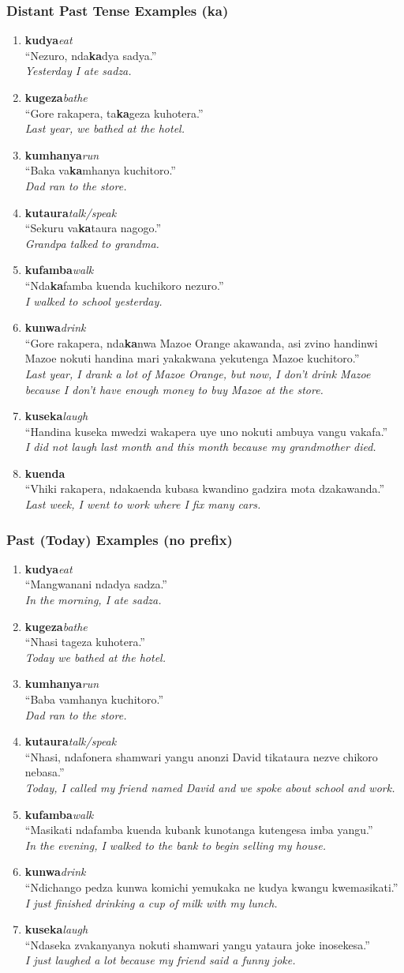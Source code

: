 \documentclass[12pt]{article}
\newcommand{\dw}[2]{\textbf{#1}\hspace{1em}\textit{#2}\\}
\newcommand{\tl}[2]{``#1''\\\textit{#2}}
\begin{document}
\subsubsection{Distant Past Tense Examples (ka)}
\begin{enumerate}
\item \dw{kudya}{eat} \tl{Nezuro, nda\textbf{ka}dya sadya.}{Yesterday I ate sadza.}
\item \dw{kugeza}{bathe} \tl{Gore rakapera, ta\textbf{ka}geza kuhotera.}{Last year, we bathed at the hotel.}
\item \dw{kumhanya}{run} \tl{Baka va\textbf{ka}mhanya kuchitoro.}{Dad ran to the store.}
\item \dw{kutaura}{talk/speak} \tl{Sekuru va\textbf{ka}taura nagogo.}{Grandpa talked to grandma.}
\item \dw{kufamba}{walk} \tl{Nda\textbf{ka}famba kuenda kuchikoro nezuro.}{I walked to school yesterday.}
\item \dw{kunwa}{drink} \tl{Gore rakapera, nda\textbf{ka}nwa Mazoe Orange akawanda, asi zvino handinwi Mazoe nokuti handina mari yakakwana yekutenga Mazoe kuchitoro.}{Last year, I drank a lot of Mazoe Orange, but now, I don't drink Mazoe because I don't have enough money to buy Mazoe at the store.}
\item \dw{kuseka}{laugh} \tl{Handina kuseka mwedzi wakapera uye uno nokuti ambuya vangu vakafa.}{I did not laugh last month and this month because my grandmother died.}
\item \dw{kuenda}{} \tl{Vhiki rakapera, ndakaenda kubasa kwandino gadzira mota dzakawanda.}{Last week, I went to work where I fix many cars.}
\end{enumerate}

\subsubsection{Past (Today) Examples (no prefix)}
\begin{enumerate}
\item \dw{kudya}{eat} \tl{Mangwanani ndadya sadza.}{In the morning, I ate sadza.}
\item \dw{kugeza}{bathe} \tl{Nhasi tageza kuhotera.}{Today we bathed at the hotel.}
\item \dw{kumhanya}{run} \tl{Baba vamhanya kuchitoro.}{Dad ran to the store.}
\item \dw{kutaura}{talk/speak} \tl{Nhasi, ndafonera shamwari yangu anonzi David tikataura nezve chikoro nebasa.}{Today, I called my friend named David and we spoke about school and work.}
\item \dw{kufamba}{walk} \tl{Masikati ndafamba kuenda kubank kunotanga kutengesa imba yangu.}{In the evening, I walked to the bank to begin selling my house.}
\item \dw{kunwa}{drink} \tl{Ndichango pedza kunwa komichi yemukaka ne kudya kwangu kwemasikati.}{I just finished drinking a cup of milk with my lunch.}
\item \dw{kuseka}{laugh} \tl{Ndaseka zvakanyanya nokuti shamwari yangu yataura joke inosekesa.}{I just laughed a lot because my friend said a funny joke.}
\end{enumerate}
\end{document}
